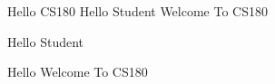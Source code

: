 \documentclass[addpoints]{exam}
\begin{document}
\begin{enumerate}
\begin{lstlisting}
\end{lstlisting}
\begin{oneparchoices} 
\hspace{0.2cm}

 \choice Hello CS180 \vspace{1em}  
 \newline
 \choice Hello Student Welcome To CS180   \vspace{1em}
 \newline 

 \choice Hello Student   \vspace{1em}
 \newline 

 \choice Hello Welcome To CS180   \vspace{1em}
 \newline \newline

 \end{oneparchoices}
\end{enumerate}
\end{document}
